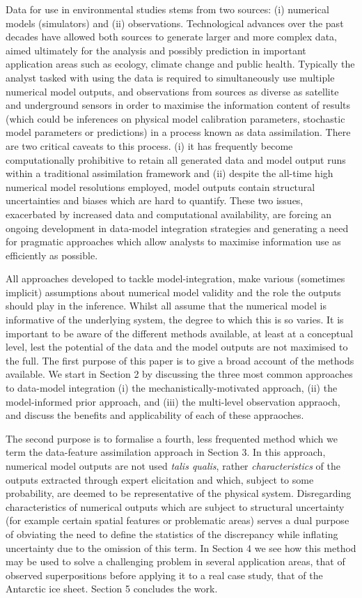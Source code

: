 \documentclass[10pt,a4paper]{article}
\begin{document}
Data for use in environmental studies stems from two sources: (i) numerical models (simulators) and (ii) observations. Technological advances over the past decades have allowed both sources to generate larger and more complex data, aimed ultimately for the analysis and possibly prediction in important application areas such as ecology, climate change and public health. Typically the analyst tasked with using the data is required to simultaneously use multiple numerical model outputs, and observations from sources as diverse as satellite and underground sensors in order to maximise the information content of results (which could be inferences on physical model calibration parameters, stochastic model parameters or predictions) in a process known as data assimilation. There are two critical caveats to this process. (i) it has frequently become computationally prohibitive to retain all generated data and model output runs within a traditional assimilation framework and (ii) despite the all-time high numerical model resolutions employed, model outputs contain structural uncertainties and biases which are hard to quantify. These two issues, exacerbated by increased data and computational availability, are forcing an ongoing development in data-model integration strategies and generating a need for pragmatic approaches which allow analysts to maximise information use as efficiently as possible.

All approaches developed to tackle model-integration, make various (sometimes implicit) assumptions about numerical model validity and the role the outputs should play in the inference. Whilst all assume that the numerical model is informative of the underlying system, the degree to which this is so varies. It is important to be aware of the different methods available, at least at a conceptual level, lest the potential of the data and the model outputs are not maximised to the full. The first purpose of this paper is to give a broad account of the methods available. We start in Section 2 by discussing the three most common approaches to data-model integration (i) the mechanistically-motivated approach, (ii) the model-informed prior approach, and (iii) the multi-level observation appraoch, and discuss the benefits and applicability of each of these appraoches.

The second purpose is to formalise a fourth, less frequented method which we term the data-feature assimilation approach in Section 3. In this  approach, numerical model outputs are not used \emph{talis qualis}, rather \emph{characteristics}  of the outputs extracted through expert elicitation and which, subject to some probability, are deemed to be representative of the physical system. Disregarding characteristics of numerical outputs which are subject to structural uncertainty (for example certain spatial features or problematic areas) serves a dual purpose of obviating the need to define the statistics of the discrepancy while inflating uncertainty due to the omission of this term.  In Section 4 we see how this method may be used to solve a challenging problem in several application areas, that of observed superpositions before applying it to a real case study, that of the Antarctic ice sheet. Section 5 concludes the work.
\end{document}
